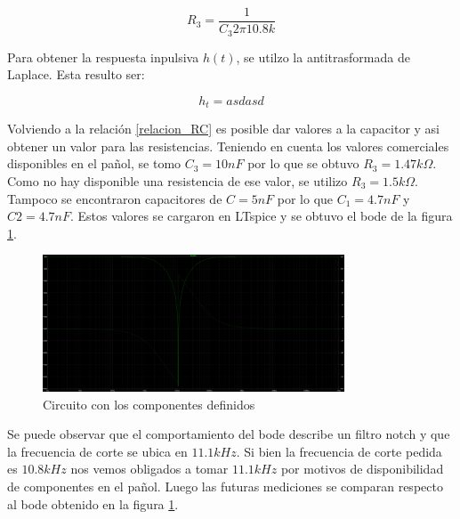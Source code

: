 \documentclass[12pt,a4paper]{article}
\begin{document}
\begin{equation} R_{3} = \frac{1}{C_{3} 2\pi 10.8k} \label{relacion_RC}\end{equation}

Para obtener la respuesta inpulsiva $h(t)$, se utilzo la antitrasformada de Laplace. Esta resulto ser: 

\begin{equation} h_{t} = asdasd  \end{equation}




Volviendo a la relación \ref{relacion_RC} es posible dar valores a la capacitor y asi obtener un valor para las resistencias. Teniendo en cuenta
los valores comerciales disponibles en el pañol, se tomo $C_{3} = 10nF$ por lo que se obtuvo $R_{3}=1.47k\Omega$. Como
no hay disponible una resistencia de ese valor, se utilizo $R_{3}=1.5k\Omega$. Tampoco se encontraron capacitores de $C = 5nF$ 
por lo que $C_{1} = 4.7nF$ y  $C{2} = 4.7nF$. Estos valores se cargaron en LTspice y se obtuvo el bode de la 
figura \ref{fig:bode_ltspice_teorico}.

\begin{figure}[ht]                                                       
    \centering\includegraphics[width=0.8\textwidth]{bode_ltspice_teorico.png}
    \caption{Circuito con los componentes definidos}
    \label{fig:bode_ltspice_teorico}
    \end{figure}

Se puede observar que el comportamiento del bode describe un filtro notch y que la frecuencia de corte se ubica en $11.1kHz$. Si
bien la frecuencia de corte pedida es $10.8kHz$ nos vemos obligados a tomar $11.1kHz$ por motivos de disponibilidad de componentes
en el pañol. Luego las futuras mediciones se comparan respecto al bode obtenido en la figura \ref{fig:bode_ltspice_teorico}. \\
\end{document}
